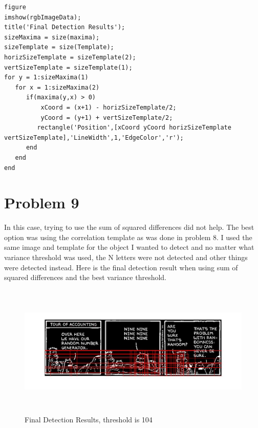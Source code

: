 \documentclass[11pt,psfig]{article}
\begin{document}
\begin{verbatim}
figure
imshow(rgbImageData);
title('Final Detection Results');
sizeMaxima = size(maxima);
sizeTemplate = size(Template);
horizSizeTemplate = sizeTemplate(2);
vertSizeTemplate = sizeTemplate(1);
for y = 1:sizeMaxima(1)
   for x = 1:sizeMaxima(2)
      if(maxima(y,x) > 0)
          xCoord = (x+1) - horizSizeTemplate/2;
          yCoord = (y+1) + vertSizeTemplate/2;
         rectangle('Position',[xCoord yCoord horizSizeTemplate vertSizeTemplate],'LineWidth',1,'EdgeColor','r');
      end
   end
end

\end{verbatim}

\newpage

\section*{Problem 9}

In this case, trying to use the sum of squared differences did not help. The best option was using the correlation template as was done in problem 8. I used the same image and template for the object I wanted to detect and no matter what variance threshold was used, the N letters were not detected and other things were detected instead. Here is the final detection result when using sum of squared differences and the best variance threshold. 

\begin{figure}[H]
\centering
\includegraphics[height=2.5in]{prob9plot_finalDetection.jpg}
\caption{Final Detection Results, threshold is 104}
\end{figure}
\end{document}
